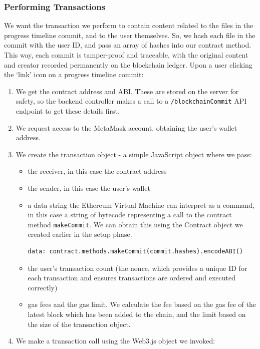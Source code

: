 \documentclass[12pt,a4paper]{article}
\begin{document}
\subsubsection{Performing Transactions}
We want the transaction we perform to contain content related to the files in the progress timeline commit, and to the user themselves. So, we hash each file in the commit with the user ID, and pass an array of hashes into our contract method. This way, each commit is tamper-proof and traceable, with the original content and creator recorded permanently on the blockchain ledger.
Upon a user clicking the `link' icon on a progress timeline commit:
\begin{enumerate}
    \item We get the contract address and ABI. These are stored on the server for safety, so the backend controller makes a call to a \verb|/blockchainCommit| API endpoint to get these details first. 
    \item We request access to the MetaMask account, obtaining the user's wallet address.
    \item We create the transaction object - a simple JavaScript object where we pass:
    \begin{itemize}
        \item the receiver, in this case the contract address
        \item the sender, in this case the user's wallet
        \item a data string the Ethereum Virtual Machine can interpret as a command, in this case a string of bytecode representing a call to the contract method \verb|makeCommit|. We can obtain this using the Contract object we created earlier in the setup phase.
        \begin{lstlisting}
data: contract.methods.makeCommit(commit.hashes).encodeABI()
        \end{lstlisting}
        \item the user's transaction count (the nonce, which provides a unique ID for each transaction and ensures transactions are ordered and executed correctly)
        \item gas fees and the gas limit. We calculate the fee based on the gas fee of the latest block which has been added to the chain, and the limit based on the size of the transaction object.
    \end{itemize}
    \item We make a transaction call using the Web3.js object we invoked:
    \begin{lstlisting}

\end{lstlisting}
\end{enumerate}
\end{document}
